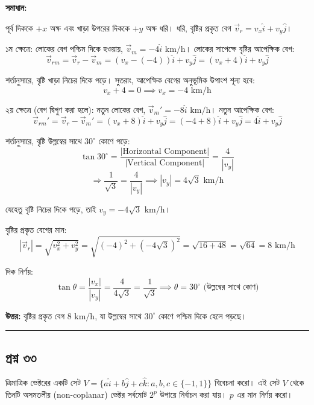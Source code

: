 \documentclass[11pt,a4paper]{article}
\begin{document}
\textbf{সমাধান:}

পূর্ব দিককে $+x$ অক্ষ এবং খাড়া উপরের দিককে $+y$ অক্ষ ধরি।
ধরি, বৃষ্টির প্রকৃত বেগ $\vec{v}_r = v_x\hat{i} + v_y\hat{j}$।

১ম ক্ষেত্রে:
লোকের বেগ পশ্চিম দিকে হওয়ায়, $\vec{v}_m = -4\hat{i}\text{ km/h}$।
লোকের সাপেক্ষে বৃষ্টির আপেক্ষিক বেগ:
$$\vec{v}_{rm} = \vec{v}_r - \vec{v}_m = (v_x - (-4))\hat{i} + v_y\hat{j} = (v_x + 4)\hat{i} + v_y\hat{j}$$

শর্তানুসারে, বৃষ্টি খাড়া নিচের দিকে পড়ে। সুতরাং, আপেক্ষিক বেগের অনুভূমিক উপাংশ শূন্য হবে:
$$v_x + 4 = 0 \implies v_x = -4\text{ km/h}$$

২য় ক্ষেত্রে (বেগ দ্বিগুণ করা হলে):
নতুন লোকের বেগ, $\vec{v}_m' = -8\hat{i}\text{ km/h}$।
নতুন আপেক্ষিক বেগ:
$$\vec{v}_{rm}' = \vec{v}_r - \vec{v}_m' = (v_x + 8)\hat{i} + v_y\hat{j} = (-4 + 8)\hat{i} + v_y\hat{j} = 4\hat{i} + v_y\hat{j}$$

শর্তানুসারে, বৃষ্টি উল্লম্বের সাথে $30^\circ$ কোণে পড়ে:
$$\tan 30^\circ = \frac{|\text{Horizontal Component}|}{|\text{Vertical Component}|} = \frac{4}{|v_y|}$$
$$\Rightarrow \frac{1}{\sqrt{3}} = \frac{4}{|v_y|} \implies |v_y| = 4\sqrt{3}\text{ km/h}$$

যেহেতু বৃষ্টি নিচের দিকে পড়ে, তাই $v_y = -4\sqrt{3}\text{ km/h}$।

বৃষ্টির প্রকৃত বেগের মান:
$$|\vec{v}_r| = \sqrt{v_x^2 + v_y^2} = \sqrt{(-4)^2 + (-4\sqrt{3})^2} = \sqrt{16 + 48} = \sqrt{64} = 8\text{ km/h}$$

দিক নির্ণয়:
$$\tan\theta = \frac{|v_x|}{|v_y|} = \frac{4}{4\sqrt{3}} = \frac{1}{\sqrt{3}} \implies \theta = 30^\circ\text{ (উল্লম্বের সাথে কোণ)}$$

\textbf{উত্তর:} বৃষ্টির প্রকৃত বেগ $8\text{ km/h}$, যা উল্লম্বের সাথে $30^\circ$ কোণে পশ্চিম দিকে হেলে পড়ছে।

\vspace{0.5cm}
\hrule
\vspace{0.5cm}

\subsection*{প্রশ্ন ৩৩}

ত্রিমাত্রিক ভেক্টরের একটি সেট $V = \{a\hat{i}+b\hat{j}+c\hat{k} : a, b, c \in \{-1, 1\}\}$ বিবেচনা করো। এই সেট $V$ থেকে তিনটি অসমতলীয় (non-coplanar) ভেক্টর সর্বমোট $2^p$ উপায়ে নির্বাচন করা যায়। $p$ এর মান নির্ণয় করো।
\end{document}
